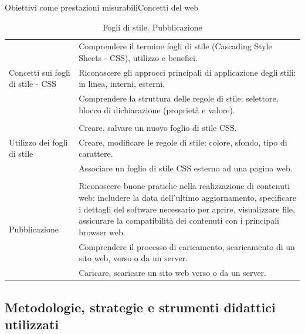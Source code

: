 \documentclass[italian]{beamer}
\begin{document}
\begin{frame}[allowframebreaks]{Obiettivi come prestazioni misurabili}{Concetti del web}
{\begin{table}
\begin{tabular}{@{}p{}p{}@{}}
				\multirow{3}{*}{\parbox{0.2\textwidth}{Concetti sui fogli
						di stile - CSS}}
				& Comprendere il termine fogli di stile (Cascading
				Style Sheets - CSS), utilizzo e benefici.\\
				& Riconoscere gli approcci principali di applicazione
				degli stili: in linea, interni, esterni.\\ 
				& Comprendere la struttura delle regole di stile:
				selettore, blocco di dichiarazione (propriet\`a e
				valore).\\
				
				\\
				
				\multirow{3}{*}{\parbox{0.2\textwidth}{Utilizzo dei fogli di
						stile}}
				& Creare, salvare un nuovo foglio di stile CSS.\\
				& Creare, modificare le regole di stile: colore, sfondo,
				tipo di carattere.\\
				& Associare un foglio di stile CSS esterno ad una
				pagina web.\\
				
				\\
				
				\multirow{3}{*}{\parbox{0.2\textwidth}{Pubblicazione}}
				& Riconoscere buone pratiche nella realizzazione di
				contenuti web: includere la data dell'ultimo
				aggiornamento, specificare i dettagli del software
				necessario per aprire, visualizzare file, assicurare la
				compatibilit\`a dei contenuti con i principali browser
				web.\\
				& Comprendere il processo di caricamento,
				scaricamento di un sito web, verso o da un server.\\
				& Caricare, scaricare un sito web verso o da un
				server.
				\\ \bottomrule
			\end{tabular}
			\caption{Fogli di stile. Pubblicazione}
		\end{table}
	}
	
\end{frame}

\subsection[Strategie\ldots]{Metodologie, strategie e strumenti didattici utilizzati}
\end{document}

